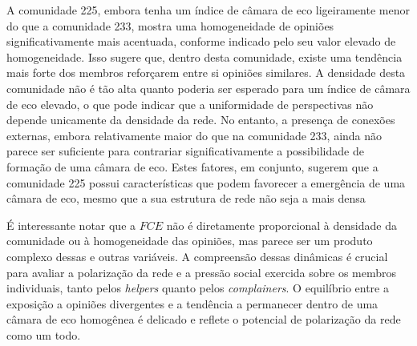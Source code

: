 A comunidade 225, embora tenha um índice de câmara de eco ligeiramente menor do que a comunidade 233, mostra uma homogeneidade de opiniões significativamente mais acentuada, conforme indicado pelo seu valor elevado de homogeneidade. Isso sugere que, dentro desta comunidade, existe uma tendência mais forte dos membros reforçarem entre si opiniões similares. A densidade desta comunidade não é tão alta quanto poderia ser esperado para um índice de câmara de eco elevado, o que pode indicar que a uniformidade de perspectivas não depende unicamente da densidade da rede. No entanto, a presença de conexões externas, embora relativamente maior do que na comunidade 233, ainda não parece ser suficiente para contrariar significativamente a possibilidade de formação de uma câmara de eco. Estes fatores, em conjunto, sugerem que a comunidade 225 possui características que podem favorecer a emergência de uma câmara de eco, mesmo que a sua estrutura de rede não seja a mais densa

É interessante notar que a $FCE$ não é diretamente proporcional à densidade da comunidade ou à homogeneidade das opiniões, mas parece ser um produto complexo dessas e outras variáveis. A compreensão dessas dinâmicas é crucial para avaliar a polarização da rede e a pressão social exercida sobre os membros individuais, tanto pelos \textit{helpers} quanto pelos \textit{complainers}. O equilíbrio entre a exposição a opiniões divergentes e a tendência a permanecer dentro de uma câmara de eco homogênea é delicado e reflete o potencial de polarização da rede como um todo.

\begin{table}[ht]
	\centering
	\caption{Resumo das Métricas de Câmaras de Eco das Comunidades em Santo André}
	\label{tab:community-barometer-metrics-santo-andre}
\end{table}

